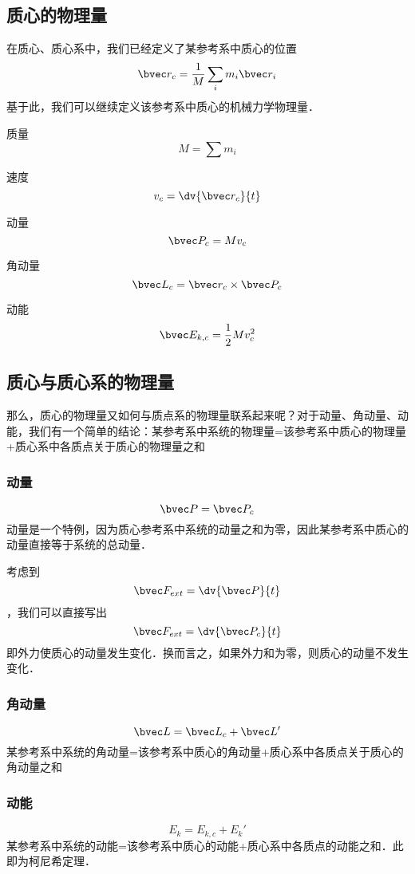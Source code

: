 
\subsection{质心的物理量}
在质心、质心系中，我们已经定义了某参考系中质心的位置
$$\bvec r_c =\frac{1}{M}\sum_i m_i \bvec r_i$$
基于此，我们可以继续定义该参考系中质心的机械力学物理量．

质量
$$M=\sum m_i$$

速度
$$v_c = \dv{\bvec r_c}{t}$$

动量
$$\bvec P_c=M v_c$$

角动量
$$\bvec L_c = \bvec r_c \times \bvec P_c $$

动能
$$\bvec E_{k,c} = \frac{1}{2} M v_c^2$$

\subsection{质心与质心系的物理量}
那么，质心的物理量又如何与质点系的物理量联系起来呢？对于动量、角动量、动能，我们有一个简单的结论：某参考系中系统的物理量=该参考系中质心的物理量+质心系中各质点关于质心的物理量之和

\subsubsection{动量}
$$\bvec P = \bvec P_c$$
动量是一个特例，因为质心参考系中系统的动量之和为零，因此某参考系中质心的动量直接等于系统的总动量．

考虑到$$\bvec F_{ext} = \dv{\bvec P}{t}$$，我们可以直接写出$$\bvec F_{ext} = \dv{\bvec P_c}{t}$$
即外力使质心的动量发生变化．换而言之，如果外力和为零，则质心的动量不发生变化．

\subsubsection{角动量}
$$\bvec L = \bvec L_c + \bvec L'$$
某参考系中系统的角动量=该参考系中质心的角动量+质心系中各质点关于质心的角动量之和

\subsubsection{动能}
$$E_k = E_{k,c} + E_k'$$
某参考系中系统的动能=该参考系中质心的动能+质心系中各质点的动能之和．此即为柯尼希定理．

